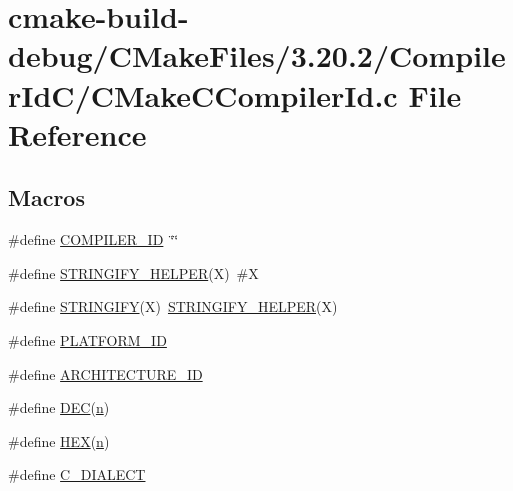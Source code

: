 \hypertarget{cmake-build-debug_2_c_make_files_23_820_82_2_compiler_id_c_2_c_make_c_compiler_id_8c}{}\section{cmake-\/build-\/debug/\+C\+Make\+Files/3.20.2/\+Compiler\+Id\+C/\+C\+Make\+C\+Compiler\+Id.c File Reference}
\label{cmake-build-debug_2_c_make_files_23_820_82_2_compiler_id_c_2_c_make_c_compiler_id_8c}
\subsection*{Macros}
\begin{DoxyCompactItemize}
\item 
\#define \hyperlink{cmake-build-debug_2_c_make_files_23_820_82_2_compiler_id_c_2_c_make_c_compiler_id_8c_a81dee0709ded976b2e0319239f72d174}{C\+O\+M\+P\+I\+L\+E\+R\+\_\+\+I\+D}~\char`\"{}\char`\"{}
\item 
\#define \hyperlink{cmake-build-debug_2_c_make_files_23_820_82_2_compiler_id_c_2_c_make_c_compiler_id_8c_a2ae9b72bb13abaabfcf2ee0ba7d3fa1d}{S\+T\+R\+I\+N\+G\+I\+F\+Y\+\_\+\+H\+E\+L\+P\+E\+R}(X)~\#X
\item 
\#define \hyperlink{cmake-build-debug_2_c_make_files_23_820_82_2_compiler_id_c_2_c_make_c_compiler_id_8c_a43e1cad902b6477bec893cb6430bd6c8}{S\+T\+R\+I\+N\+G\+I\+F\+Y}(X)~\hyperlink{cmake-build-debug_2_c_make_files_23_820_82_2_compiler_id_c_2_c_make_c_compiler_id_8c_a2ae9b72bb13abaabfcf2ee0ba7d3fa1d}{S\+T\+R\+I\+N\+G\+I\+F\+Y\+\_\+\+H\+E\+L\+P\+E\+R}(X)
\item 
\#define \hyperlink{cmake-build-debug_2_c_make_files_23_820_82_2_compiler_id_c_2_c_make_c_compiler_id_8c_adbc5372f40838899018fadbc89bd588b}{P\+L\+A\+T\+F\+O\+R\+M\+\_\+\+I\+D}
\item 
\#define \hyperlink{cmake-build-debug_2_c_make_files_23_820_82_2_compiler_id_c_2_c_make_c_compiler_id_8c_aba35d0d200deaeb06aee95ca297acb28}{A\+R\+C\+H\+I\+T\+E\+C\+T\+U\+R\+E\+\_\+\+I\+D}
\item 
\#define \hyperlink{cmake-build-debug_2_c_make_files_23_820_82_2_compiler_id_c_2_c_make_c_compiler_id_8c_ad1280362da42492bbc11aa78cbf776ad}{D\+E\+C}(\hyperlink{lesson3_8c_acfc02ec89670db29251fda6a66602ce2}{n})
\item 
\#define \hyperlink{cmake-build-debug_2_c_make_files_23_820_82_2_compiler_id_c_2_c_make_c_compiler_id_8c_a46d5d95daa1bef867bd0179594310ed5}{H\+E\+X}(\hyperlink{lesson3_8c_acfc02ec89670db29251fda6a66602ce2}{n})
\item 
\#define \hyperlink{cmake-build-debug_2_c_make_files_23_820_82_2_compiler_id_c_2_c_make_c_compiler_id_8c_a07f8e5783674099cd7f5110e22a78cdb}{C\+\_\+\+D\+I\+A\+L\+E\+C\+T}
\end{DoxyCompactItemize}
